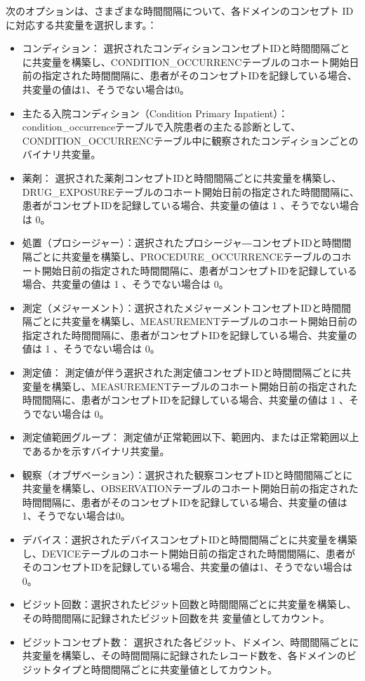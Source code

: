\documentclass[
  11pt]{book}
\theoremstyle{definition}
\theoremstyle{definition}
\theoremstyle{definition}
\theoremstyle{definition}
\theoremstyle{remark}
\begin{document}
次のオプションは、さまざまな時間間隔について、各ドメインのコンセプト ID に対応する共変量を選択します。：

\begin{itemize}
\item
  コンディション： 選択されたコンディションコンセプトIDと時間間隔ごとに共変量を構築し、CONDITION\_OCCURRENCテーブルのコホート開始日前の指定された時間間隔に、患者がそのコンセプトIDを記録している場合、共変量の値は1、そうでない場合は0。
\item
  主たる入院コンディション（Condition Primary Inpatient）： condition\_occurrenceテーブルで入院患者の主たる診断として、CONDITION\_OCCURRENCテーブル中に観察されたコンディションごとのバイナリ共変量。
\item
  薬剤： 選択された薬剤コンセプトIDと時間間隔ごとに共変量を構築し、DRUG\_EXPOSUREテーブルのコホート開始日前の指定された時間間隔に、患者がコンセプトIDを記録している場合、共変量の値は 1 、そうでない場合は 0。
\item
  処置（プロシージャー）：選択されたプロシージャ―コンセプトIDと時間間隔ごとに共変量を構築し、PROCEDURE\_OCCURRENCEテーブルのコホート開始日前の指定された時間間隔に、患者がコンセプトIDを記録している場合、共変量の値は 1 、そうでない場合は 0。
\item
  測定（メジャーメント）：選択されたメジャーメントコンセプトIDと時間間隔ごとに共変量を構築し、MEASUREMENTテーブルのコホート開始日前の指定された時間間隔に、患者がコンセプトIDを記録している場合、共変量の値は 1 、そうでない場合は 0。
\item
  測定値： 測定値が伴う選択された測定値コンセプトIDと時間間隔ごとに共変量を構築し、MEASUREMENTテーブルのコホート開始日前の指定された時間間隔に、患者がコンセプトIDを記録している場合、共変量の値は 1 、そうでない場合は 0。
\item
  測定値範囲グループ： 測定値が正常範囲以下、範囲内、または正常範囲以上であるかを示すバイナリ共変量。
\item
  観察（オブザベーション）：選択された観察コンセプトIDと時間間隔ごとに共変量を構築し、OBSERVATIONテーブルのコホート開始日前の指定された時間間隔に、患者がそのコンセプトIDを記録している場合、共変量の値は1、そうでない場合は0。
\item
  デバイス：選択されたデバイスコンセプトIDと時間間隔ごとに共変量を構築し、DEVICEテーブルのコホート開始日前の指定された時間間隔に、患者がそのコンセプトIDを記録している場合、共変量の値は1、そうでない場合は0。
\item
  ビジット回数：選択されたビジット回数と時間間隔ごとに共変量を構築し、その時間間隔に記録されたビジット回数を共 変量値としてカウント。
\item
  ビジットコンセプト数： 選択された各ビジット、ドメイン、時間間隔ごとに共変量を構築し、その時間間隔に記録されたレコード数を、各ドメインのビジットタイプと時間間隔ごとに共変量値としてカウント。
\end{itemize}
\end{document}
